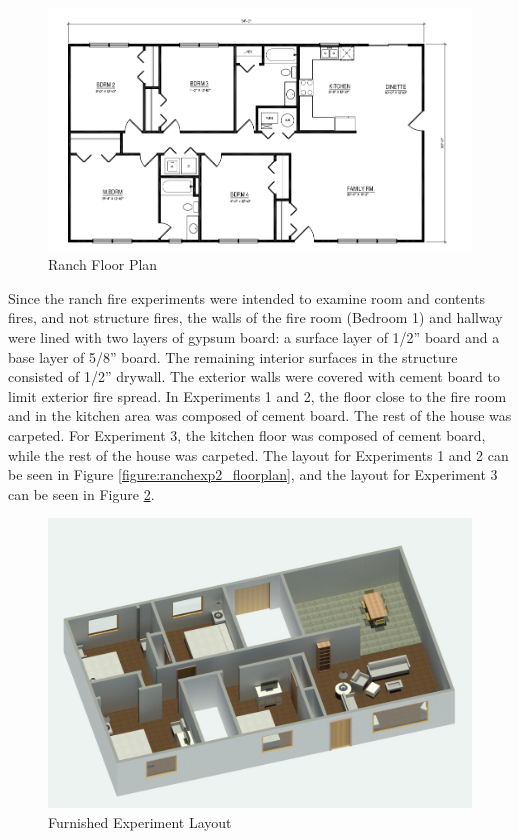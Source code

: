 \documentclass[12pt,oneside]{book}
\begin{document}
\begin{figure}[H]
\centering
\includegraphics[width=\textwidth]{0_Images/Ranch_Pictures/Ranch_Floor_Plan.png}
\caption{Ranch Floor Plan}
\label{figure:ranchexp1_floorplan}
\end{figure}

Since the ranch fire experiments were intended to examine room and contents fires, and not structure fires, the walls of the fire room (Bedroom 1) and hallway were lined with two layers of gypsum board: a surface layer of 1/2'' board and a base layer of 5/8'' board. The remaining interior surfaces in the structure consisted of 1/2'' drywall. The exterior walls were covered with cement board to limit exterior fire spread. In Experiments 1 and 2, the floor close to the fire room and in the kitchen area was composed of cement board. The rest of the house was carpeted. For Experiment 3, the kitchen floor was composed of cement board, while the rest of the house was carpeted. The layout for Experiments 1 and 2 can be seen in Figure \ref{figure:ranchexp2_floorplan}, and the layout for Experiment 3 can be seen in Figure \ref{figure:ranchexp3_floorplan}.

\begin{figure}[H]
\centering
\includegraphics[width=.75\textwidth]{0_Images/Ranch_Pictures/Report_ISO_Furniture.jpg}
\caption{Furnished Experiment Layout}
\label{figure:ranchexp3_floorplan}
\end{figure}
\end{document}
